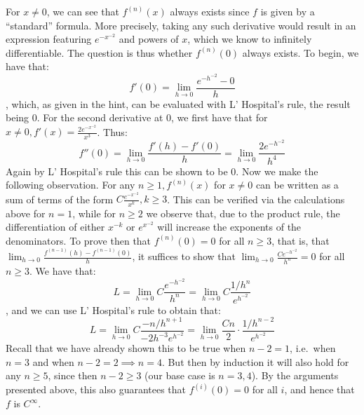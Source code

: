 \begin{solution}

    For $x \neq 0$, we can see that $f^{(n)}(x)$ always exists since $f$ is given by a ``standard'' formula.
    More precisely, taking any such derivative would result in an expression featuring $e^{-x^{-2}}$ and powers of $x$, which we know to infinitely differentiable.
    The question is thus whether $f^{(n)}(0)$ always exists.
    To begin, we have that:
    $$f'(0) = \lim_{h \rightarrow 0} \frac{e^{-h^{-2}}- 0 }{h}$$
    , which, as given in the hint, can be evaluated with L' Hospital's rule, the result being 0.
    For the second derivative at 0, we first have that for $x \neq 0, f'(x) = \frac{2e^{-x^{-2}}}{x^3}$.
    Thus:
    $$f''(0) = \lim_{h \rightarrow 0} \frac{f'(h) - f'(0)}{h} = \lim_{h \rightarrow 0} \frac{2e^{-h^{-2}}}{h^4}$$
    Again by L' Hospital's rule this can be shown to be 0.
    Now we make the following observation.
    For any $n \geq 1, f^{(n)}(x)$ for $ x \neq 0$ can be written as a sum of terms of the form $C \frac{e^{-x^{-2}}}{x^k}, k \geq 3$.
    This can be verified via the calculations above for $n = 1$, while for $n \geq 2$ we observe that, due to the product rule, the differentiation of either $x^{-k}$ or $e^{x^{-2}}$ will increase the exponents of the denominators.
    To prove then that $f^{(n)}(0) = 0$ for all $n \geq 3$, that is, that $\lim_{h \rightarrow 0} \frac{f^{(n-1)}(h) - f^{(n-1)}(0)}{h}$, it suffices to show that $\lim_{h \rightarrow 0} \frac{Ce^{-h^{-2}}}{h^n} = 0$ for all $n \geq 3$.
    We have that:
    $$L = \lim_{h \rightarrow 0} C \frac{e^{-h^{-2}}}{h^n} = \lim_{h \rightarrow 0} C\frac{1/h^n}{e^{h^{-2}}}$$
    , and we can use L' Hospital's rule to obtain that:
    $$L = \lim_{h \rightarrow 0} C \frac{-n/h^{n+1}}{-2h^{-3}e^{h^{-2}}} = \lim_{h \rightarrow 0} \frac{Cn}{2} \cdot \frac{1/h^{n - 2}}{e^{h^{-2}}}$$
    Recall that we have already shown this to be true when $n - 2 = 1$, i.e.\ when $n = 3$ and when $n - 2 = 2 \implies n = 4$.
    But then by induction it will also hold for any $n \geq 5$, since then $n - 2 \geq 3$ (our base case is $n =3, 4$).
    By the arguments presented above, this also guarantees that $f^{(i)}(0) = 0$ for all $i$, and hence that $f$ is $C^{\infty}$.
    
\end{solution}


